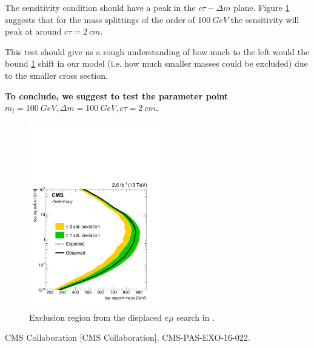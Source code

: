 \documentclass[12pt,letterpaper,notitlepage]{article}
\begin{document}
The sensitivity condition should have a peak in the $c\tau-\Delta m$ plane. Figure \ref{fig:CMS_exclusion} suggests that for the mass splittings of the order of $100\ GeV$ the sensitivity will peak at around $c \tau=2\ cm$.

This test should give us a rough understanding of how much to the left would the bound \ref{fig:CMS_exclusion} shift in our model (i.e. how much smaller masses could be excluded) due to the smaller cross section.

\textbf{To conclude, we suggest to test the parameter point $m_l = 100\ GeV, \Delta m=100\ GeV, c\tau=2\ cm$.}


\begin{figure}[H]
\centering
\includegraphics[height=3.2in]{fig-benchmarks/CMS_exclusion.png}
\caption{\label{fig:CMS_exclusion} Exclusion region from the displaced $e\mu$ search in \cite{CMS:2016isf}.}
\end{figure}

\begin{thebibliography}{6}

    CMS Collaboration [CMS Collaboration],
    CMS-PAS-EXO-16-022.


\end{thebibliography}
\end{document}
